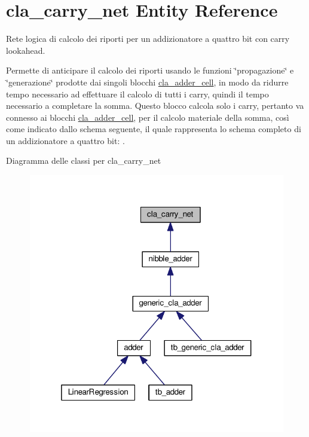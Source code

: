 \hypertarget{classcla__carry__net}{}\section{cla\+\_\+carry\+\_\+net Entity Reference}
\label{classcla__carry__net}


Rete logica di calcolo dei riporti per un addizionatore a quattro bit con carry lookahead.

Permette di anticipare il calcolo dei riporti usando le funzioni \char`\"{}propagazione\char`\"{} e \char`\"{}generazione\char`\"{} prodotte dai singoli blocchi \hyperlink{classcla__adder__cell}{cla\+\_\+adder\+\_\+cell}, in modo da ridurre tempo necessario ad effettuare il calcolo di tutti i carry, quindi il tempo necessario a completare la somma. Questo blocco calcola solo i carry, pertanto va connesso ai blocchi \hyperlink{classcla__adder__cell}{cla\+\_\+adder\+\_\+cell}, per il calcolo materiale della somma, così come indicato dallo schema seguente, il quale rappresenta lo schema completo di un addizionatore a quattro bit\+: .  




Diagramma delle classi per cla\+\_\+carry\+\_\+net
\nopagebreak
\begin{figure}[H]
\begin{center}
\leavevmode
\includegraphics[width=319pt]{classcla__carry__net__inherit__graph}
\end{center}
\end{figure}
